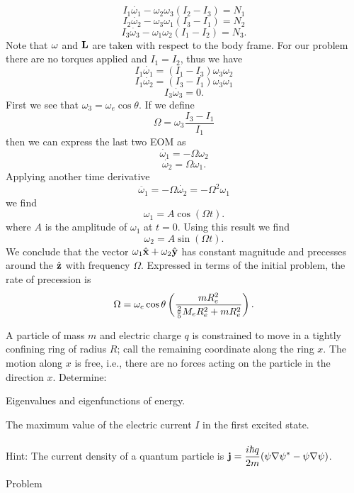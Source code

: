 \documentclass[11pt,letterpaper]{article}
\begin{document}
			\[
				I_1\dot{\omega_1}-\omega_2\omega_3(I_2-I_3) = N_1
			\]
			\[
				I_2\dot{\omega_2}-\omega_3\omega_1(I_3-I_1) = N_2
			\]
			\[
				I_3\dot{\omega_3}-\omega_1\omega_2(I_1-I_2) = N_3.
			\]
			Note that $\mathbf{\omega}$ and $\mathbf{L}$ are taken with respect to the body frame. For our problem there are no torques 
			applied and $I_1=I_2$, thus we have
			\[
				I_1\dot{\omega_1} = (I_1-I_3)\omega_3\omega_2
			\]
			\[
				I_1\dot{\omega_2}= (I_3-I_1)\omega_3\omega_1
			\]
			\[
				I_3\dot{\omega_3} = 0. 
			\]
			First we see that $\omega_3 = \omega_e\cos\theta$. If we define
			\[
				\Omega = \omega_3\frac{I_3-I_1}{I_1}
			\]
			then we can express the last two EOM as
			\[
				\dot{\omega_1}  = -\Omega \omega_2
			\]
			\[
				\dot{\omega_2} = \Omega\omega_1. 
			\]
			Applying another time derivative
			\[
				\ddot{\omega_1} = -\Omega\dot{\omega_2} = -\Omega^2\omega_1
			\]
			we find
			\[
				\omega_1 = A\cos(\Omega t).
			\]
			where $A$ is the amplitude of $\omega_1$ at $t=0$.
			Using this result we find 
			\[
				\omega_2 = A\sin(\Omega t).
			\]
			We conclude that the vector $\omega_1\hat{\mathbf{x}} +\omega_2 \hat{\mathbf{y}}$ has constant magnitude and precesses around the
			$\hat{\mathbf{z}}$ with frequency $\Omega$. Expressed in terms of the initial problem, the rate of precession is
			\[
				\Omega = \omega_e\cos\theta\left(\frac{mR_e^2}{\frac{2}{5}M_eR_e^2+mR_e^2}\right). 
			\]
		\eenum
		\item
		A particle of mass $m$ and electric charge $q$ is constrained to move in a tightly confining ring of radius $R$; call the remaining 
		coordinate along the ring $x$. The motion along $x$ is free, i.e., there are no forces acting on the particle in the direction $x$.
		Determine:
		\benum
			\item
			Eigenvalues and eigenfunctions of energy.
			\item
			The maximum value of the electric current $I$ in the first excited state.
			\\
			\\
			Hint: The current density of a quantum particle is $\displaystyle\mathbf{j} = \frac{i\hbar q}{2m}(\psi\nabla\psi^*-\psi\nabla\psi)$.
		\eenum	
		\item
		Problem
		\benum
			\item
			
\end{document}
